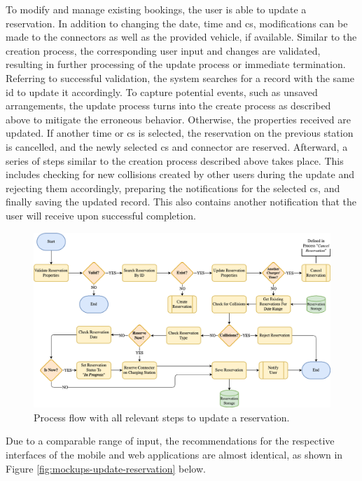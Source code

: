 To modify and manage existing bookings, the user is able to update a reservation. In addition to changing the date, time and \acrshort{cs}, modifications can be made to the connectors as well as the provided vehicle, if available. 
Similar to the creation process, the corresponding user input and changes are validated, resulting in further processing of the update process or immediate termination.
Referring to successful validation, the system searches for a record with the same \acrshort{id} to update it accordingly.
To capture potential events, such as unsaved arrangements, the update process turns into the create process as described above to mitigate the erroneous behavior.
Otherwise, the properties received are updated. If another time or \acrshort{cs} is selected, the reservation on the previous station is cancelled, and the newly selected \acrshort{cs} and connector are reserved.
Afterward, a series of steps similar to the creation process described above takes place. This includes checking for new collisions created by other users during the update and rejecting them accordingly, preparing the notifications for the selected \acrshort{cs}, and finally saving the updated record.
This also contains another notification that the user will receive upon successful completion.

\begin{figure}[h]
    \centering
    \includegraphics[scale=0.4]{resources/images/main/5_design/processes/ReservationUpdate.png}
    \caption{Process flow with all relevant steps to update a reservation.}
    \label{fig:update-reservation-flowchart}
\end{figure}

\noindent Due to a comparable range of input, the recommendations for the respective interfaces of the mobile and web applications are almost identical, as shown in Figure \ref{fig:mockups-update-reservation} below.

